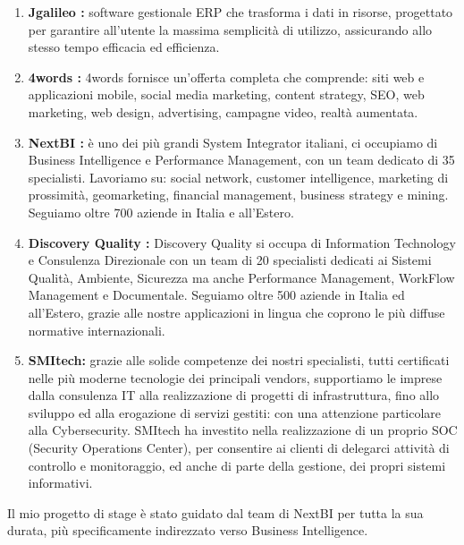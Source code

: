 \begin{enumerate}

\item \textbf{Jgalileo :}  software gestionale ERP che trasforma i dati in risorse, progettato per garantire all’utente la massima semplicità di utilizzo, assicurando allo stesso tempo efficacia ed efficienza.

\item \textbf{4words :} 4words fornisce un'offerta completa che comprende: siti web e applicazioni mobile, social media marketing, content strategy, SEO, web marketing, web design, advertising, campagne video, realtà aumentata.

\item \textbf{NextBI :}  è uno dei più grandi System Integrator italiani, ci occupiamo di Business Intelligence e Performance Management, con un team dedicato di 35 specialisti. Lavoriamo su: social network, customer intelligence, marketing di prossimità, geomarketing, financial management, business strategy e mining. Seguiamo oltre 700 aziende in Italia e all’Estero.

\item \textbf{Discovery Quality :} Discovery Quality si occupa di Information Technology e Consulenza Direzionale con un team di 20 specialisti dedicati ai Sistemi Qualità, Ambiente, Sicurezza ma anche Performance Management, WorkFlow Management e Documentale. Seguiamo oltre 500 aziende in Italia ed all’Estero, grazie alle nostre applicazioni in lingua che coprono le più diffuse normative internazionali.

\item \textbf{SMItech:} grazie alle solide competenze dei nostri specialisti, tutti certificati nelle più moderne tecnologie dei principali vendors, supportiamo le imprese dalla consulenza IT alla realizzazione di progetti di infrastruttura, fino allo sviluppo ed alla erogazione di servizi gestiti: con una attenzione particolare alla Cybersecurity. SMItech ha investito nella realizzazione di un proprio SOC (Security Operations Center), per consentire ai clienti di delegarci attività di controllo e monitoraggio, ed anche di parte della gestione, dei propri sistemi informativi.

\end{enumerate}
Il mio progetto di stage è stato guidato dal team di NextBI per tutta la sua durata, più specificamente indirezzato verso Business Intelligence. 


    
\clearpage






